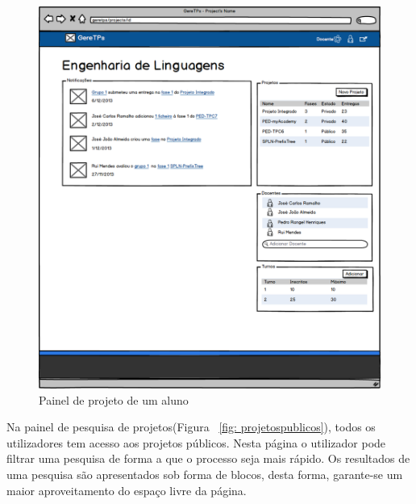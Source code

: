\begin{figure}[H]
        \centering
        \includegraphics[width=1\textwidth]{images/prototipos/mockups/cursodocente.png}
         \caption{Painel de projeto de um aluno}
         \label{fig: cursodocente}
\end{figure}

Na painel de pesquisa de projetos(Figura ~\ref{fig: projetospublicos}), todos os utilizadores tem acesso aos projetos públicos. Nesta página o utilizador pode filtrar uma pesquisa de forma a que o processo seja mais rápido. Os resultados de uma pesquisa são apresentados sob forma de blocos, desta forma, garante-se um maior aproveitamento do espaço livre da página.\\

